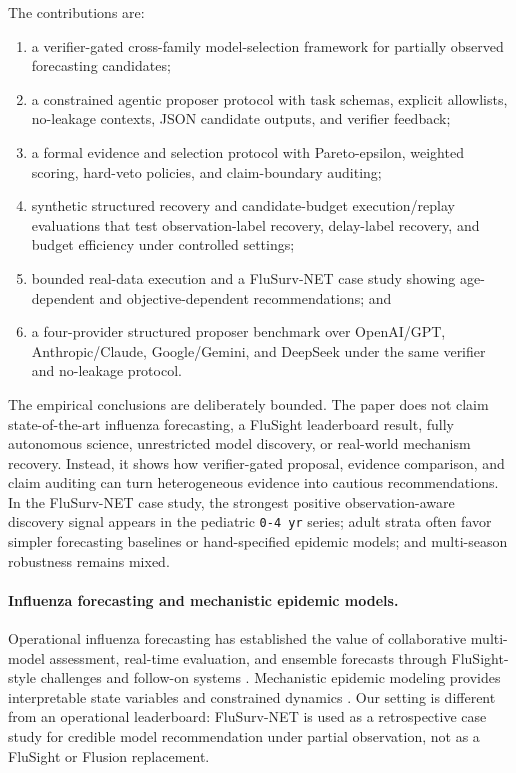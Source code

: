 The contributions are:
\begin{enumerate}[leftmargin=1.5em]
\item a verifier-gated cross-family model-selection framework for partially
observed forecasting candidates;
\item a constrained agentic proposer protocol with task schemas, explicit
allowlists, no-leakage contexts, JSON candidate outputs, and verifier
feedback;
\item a formal evidence and selection protocol with Pareto-epsilon, weighted
scoring, hard-veto policies, and claim-boundary auditing;
\item synthetic structured recovery and candidate-budget execution/replay
evaluations that test observation-label recovery, delay-label recovery, and
budget efficiency under controlled settings;
\item bounded real-data execution and a FluSurv-NET case study showing
age-dependent and objective-dependent recommendations; and
\item a four-provider structured proposer benchmark over OpenAI/GPT,
Anthropic/Claude, Google/Gemini, and DeepSeek under the same verifier and
no-leakage protocol.
\end{enumerate}

The empirical conclusions are deliberately bounded. The paper does not claim
state-of-the-art influenza forecasting, a FluSight leaderboard result, fully
autonomous science, unrestricted model discovery, or real-world mechanism
recovery. Instead, it shows how verifier-gated proposal, evidence comparison,
and claim auditing can turn heterogeneous evidence into cautious
recommendations. In the FluSurv-NET case study, the strongest positive
observation-aware discovery signal appears in the pediatric \texttt{0-4 yr}
series; adult strata often favor simpler forecasting baselines or
hand-specified epidemic models; and multi-season robustness remains mixed.

\paragraph{Influenza forecasting and mechanistic epidemic models.}
Operational influenza forecasting has established the value of collaborative
multi-model assessment, real-time evaluation, and ensemble forecasts through
FluSight-style challenges and follow-on systems
\cite{shaman2012forecasting,shaman2013realtime,biggerstaff2016challenge,
mcgowan2019collaborative,reich2019collaborative,reich2019accuracy,
lutz2019pathforward,ray2025flusion}. Mechanistic epidemic modeling provides
interpretable state variables and constrained dynamics
\cite{anderson1991infectious,keeling2008modeling,breto2009mechanistic,
king2016pomp}. Our setting is different from an operational leaderboard:
FluSurv-NET is used as a retrospective case study for credible model
recommendation under partial observation, not as a FluSight or Flusion
replacement.

